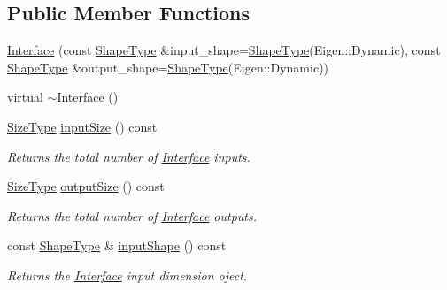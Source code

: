 \subsection*{Public Member Functions}
\begin{DoxyCompactItemize}
\item 
\hyperlink{classffnn_1_1layer_1_1internal_1_1_interface_a8cd5a34202113edec18a64518d67b76f}{Interface} (const \hyperlink{classffnn_1_1layer_1_1internal_1_1_interface_a945709b1d0ea54a51539b80d04485f5f}{Shape\-Type} \&input\-\_\-shape=\hyperlink{classffnn_1_1layer_1_1internal_1_1_interface_a945709b1d0ea54a51539b80d04485f5f}{Shape\-Type}(Eigen\-::\-Dynamic), const \hyperlink{classffnn_1_1layer_1_1internal_1_1_interface_a945709b1d0ea54a51539b80d04485f5f}{Shape\-Type} \&output\-\_\-shape=\hyperlink{classffnn_1_1layer_1_1internal_1_1_interface_a945709b1d0ea54a51539b80d04485f5f}{Shape\-Type}(Eigen\-::\-Dynamic))
\item 
virtual \hyperlink{classffnn_1_1layer_1_1internal_1_1_interface_a87499fd55b6612a35a1af5b13b851a55}{$\sim$\-Interface} ()
\item 
\hyperlink{classffnn_1_1layer_1_1internal_1_1_interface_af0567642f60c65b5e87067226a54174b}{Size\-Type} \hyperlink{classffnn_1_1layer_1_1internal_1_1_interface_a6de2e5a7e17c266f52d695ccf8e0b379}{input\-Size} () const 
\begin{DoxyCompactList}\small\item\em Returns the total number of \hyperlink{classffnn_1_1layer_1_1internal_1_1_interface}{Interface} inputs. \end{DoxyCompactList}\item 
\hyperlink{classffnn_1_1layer_1_1internal_1_1_interface_af0567642f60c65b5e87067226a54174b}{Size\-Type} \hyperlink{classffnn_1_1layer_1_1internal_1_1_interface_a3578b4137e24bd8992cdc8dd6def0745}{output\-Size} () const 
\begin{DoxyCompactList}\small\item\em Returns the total number of \hyperlink{classffnn_1_1layer_1_1internal_1_1_interface}{Interface} outputs. \end{DoxyCompactList}\item 
const \hyperlink{classffnn_1_1layer_1_1internal_1_1_interface_a945709b1d0ea54a51539b80d04485f5f}{Shape\-Type} \& \hyperlink{classffnn_1_1layer_1_1internal_1_1_interface_ac1fdda72086fe9c9bb05c2211fc9f050}{input\-Shape} () const 
\begin{DoxyCompactList}\small\item\em Returns the \hyperlink{classffnn_1_1layer_1_1internal_1_1_interface}{Interface} input dimension oject. \end{DoxyCompactList}\item 

\end{DoxyCompactItemize}
